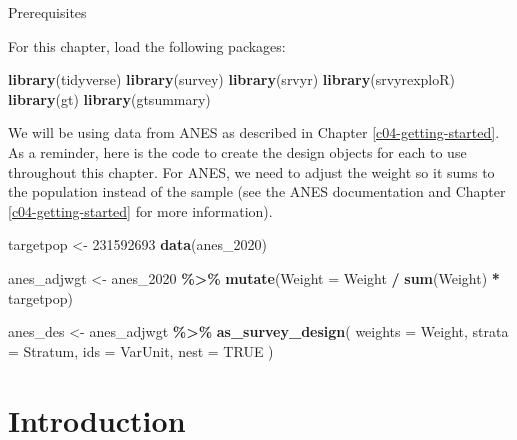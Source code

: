 \documentclass[
]{krantz}
\makeatletter
\newenvironment{Shaded}{\begin{snugshade}}{\end{snugshade}}
\newcommand{\AttributeTok}[1]{\textcolor[rgb]{0.27,0.27,0.27}{#1}}
\newcommand{\ConstantTok}[1]{\textcolor[rgb]{0.37,0.37,0.37}{#1}}
\newcommand{\DecValTok}[1]{\textcolor[rgb]{0.06,0.06,0.06}{#1}}
\newcommand{\FunctionTok}[1]{\textcolor[rgb]{0.27,0.27,0.27}{\textbf{#1}}}
\newcommand{\NormalTok}[1]{#1}
\newcommand{\OtherTok}[1]{\textcolor[rgb]{0.37,0.37,0.37}{#1}}
\newcommand{\SpecialCharTok}[1]{\textcolor[rgb]{0.43,0.43,0.43}{\textbf{#1}}}
\newenvironment{kframe}{%
\medskip{}
\setlength{\fboxsep}{.8em}
 \def\at@end@of@kframe{}%
 \ifinner\ifhmode%
  \def\at@end@of@kframe{\end{minipage}}%
  \begin{minipage}{\columnwidth}%
 \fi\fi%
 \def\FrameCommand##1{\hskip\@totalleftmargin \hskip-\fboxsep
 \colorbox{shadecolor}{##1}\hskip-\fboxsep
     \hskip-\linewidth \hskip-\@totalleftmargin \hskip\columnwidth}%
 \MakeFramed {\advance\hsize-\width
   \@totalleftmargin\z@ \linewidth\hsize
   \@setminipage}}%
 {\par\unskip\endMakeFramed%
 \at@end@of@kframe}
\renewenvironment{Shaded}{\begin{kframe}}{\end{kframe}}
\makeatother
\begin{document}
\begin{prereqbox}{Prerequisites}

For this chapter, load the following packages:

\begin{Shaded}
\begin{Highlighting}[]
\FunctionTok{library}\NormalTok{(tidyverse)}
\FunctionTok{library}\NormalTok{(survey)}
\FunctionTok{library}\NormalTok{(srvyr)}
\FunctionTok{library}\NormalTok{(srvyrexploR)}
\FunctionTok{library}\NormalTok{(gt)}
\FunctionTok{library}\NormalTok{(gtsummary)}
\end{Highlighting}
\end{Shaded}

We will be using data from ANES as described in Chapter \ref{c04-getting-started}. As a reminder, here is the code to create the design objects for each to use throughout this chapter. For ANES, we need to adjust the weight so it sums to the population instead of the sample (see the ANES documentation and Chapter \ref{c04-getting-started} for more information).

\begin{Shaded}
\begin{Highlighting}[]
\NormalTok{targetpop }\OtherTok{\textless{}{-}} \DecValTok{231592693}
\FunctionTok{data}\NormalTok{(anes\_2020)}

\NormalTok{anes\_adjwgt }\OtherTok{\textless{}{-}}\NormalTok{ anes\_2020 }\SpecialCharTok{\%\textgreater{}\%}
  \FunctionTok{mutate}\NormalTok{(}\AttributeTok{Weight =}\NormalTok{ Weight }\SpecialCharTok{/} \FunctionTok{sum}\NormalTok{(Weight) }\SpecialCharTok{*}\NormalTok{ targetpop)}

\NormalTok{anes\_des }\OtherTok{\textless{}{-}}\NormalTok{ anes\_adjwgt }\SpecialCharTok{\%\textgreater{}\%}
  \FunctionTok{as\_survey\_design}\NormalTok{(}
    \AttributeTok{weights =}\NormalTok{ Weight,}
    \AttributeTok{strata =}\NormalTok{ Stratum,}
    \AttributeTok{ids =}\NormalTok{ VarUnit,}
    \AttributeTok{nest =} \ConstantTok{TRUE}
\NormalTok{  )}
\end{Highlighting}
\end{Shaded}

\end{prereqbox}

\hypertarget{introduction-6}{%
\section{Introduction}\label{introduction-6}}
\end{document}
